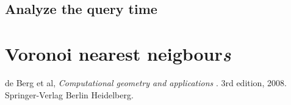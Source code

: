 \documentclass{article}
\begin{document}
\subsection{Analyze the query time}

\section{Voronoi nearest neigbour\emph{s}}

\begin{thebibliography}{9}
de Berg et al,
\textit{Computational geometry and applications }.
3rd edition, 2008. Springer-Verlag Berlin Heidelberg.
\end{thebibliography}
\end{document}
